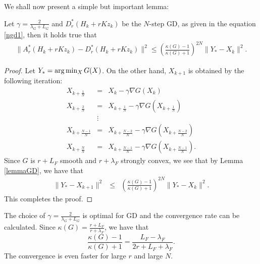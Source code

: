 We shall now present a simple but important lemma: 
\begin{lemma}\label{main:lm} 
Let $\gamma = \frac{2}{\lambda_{G} + L_{G}}$ and $D_r^*(H_k + rKz_k)$ be the $N$-step GD, as given in the equation \eqref{ngd1}, then it holds true that 
\begin{eqnarray*}
\|A_r^*(H_k + rKz_k) - D_r^*(H_k + rKz_k)\|^2 \leq  \left ( \frac{\kappa(G) - 1}{\kappa(G) + 1} \right )^{2N} \|Y_* - X_k\|^2. 
\end{eqnarray*}
\end{lemma}
\begin{proof}
Let $Y_* = {\rm arg} \min_{X} G(X)$. On the other hand, $X_{k+1}$ is obtained by the following iteration: 
\begin{eqnarray*} 
X_{k+\frac{1}{N}} &=& X_{k} - \gamma \nabla G(X_k) \\
X_{k+\frac{2}{N}} &=& X_{k+\frac{1}{N}} - \gamma \nabla G(X_{k+\frac{1}{N}}) \\ 
&\vdots& \\  
X_{k+\frac{N-1}{N}} &=& X_{k+\frac{N-2}{N}} - \gamma \nabla G(X_{k + \frac{N-2}{N}}) \\
X_{k+\frac{N}{N}} &=& 
X_{k+\frac{N-1}{N}} - \gamma \nabla G(X_{k+\frac{N-1}{N}}).  
\end{eqnarray*}
Since $G$ is $r+L_F$ smooth and $r+\lambda_F$ strongly convex, we see that by Lemma \ref{lemmaGD}, we have that 
\begin{eqnarray*}
\|Y_* - X_{k+1}\|^2 &\leq& \left ( \frac{\kappa(G)-1}{\kappa(G)+1} \right )^{2N} \|Y_* - X_k\|^2. 
\end{eqnarray*}
%
This completes the proof. 
\end{proof}
\begin{remark} 
The choice of $\gamma = \frac{2}{\lambda_{G} + L_{G}}$ is optimal for GD and the convergence rate can be calculated. Since $\kappa(G) = \frac{r + L_F}{r + \lambda_F}$, we have that 
\begin{equation}
\frac{\kappa(G)-1}{\kappa(G)+1} = \frac{L_F - \lambda_F}{2r + L_F + \lambda_F}. 
\end{equation}
The convergence is even faster for large $r$ and large $N$.
\end{remark}
